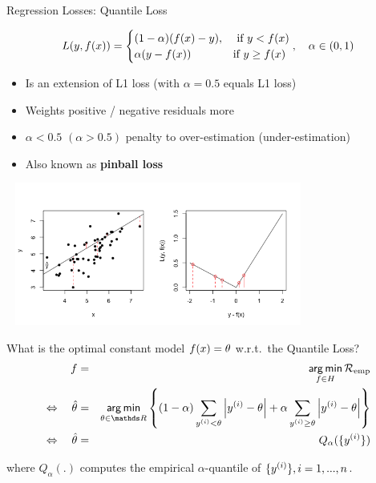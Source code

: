 \begin{vbframe}{Regression Losses: Quantile Loss}
\vspace{-0.3cm}

\footnotesize
$$
L(y, f(x)) = \begin{cases} (1 - \alpha) (f(x) - y), & \text{ if } y < f(x)\\
\alpha (y - f(x)) & \text{if } y \ge f(x)
\end{cases}, \quad \alpha \in (0, 1)
$$


\normalsize
\begin{itemize}
\item Is an extension of L1 loss (with $\alpha = 0.5$ equals L1 loss)
\item Weights positive / negative residuals more 
\item $\alpha<0.5$ $(\alpha>0.5)$ penalty to over-estimation (under-estimation)
\item Also known as \textbf{pinball loss}
\end{itemize}

\vspace*{-0.5cm}

\begin{center}
\includegraphics[width = 10cm, height = 4.7cm]{figure_man/2_3_loss_pinball_plot2.png}
\end{center}

\framebreak

What is the optimal constant model $f(x) = \theta$ w.r.t.\ the Quantile Loss?
\vspace{-0.2cm}
\begin{eqnarray*}
f &=& \argmin_{f \in \Hspace} \riske \\
\Leftrightarrow\quad 
\hat \theta &=& \argmin_{\theta \in \R}\left\{ (1 - \alpha) \sum_{\yi<\theta}  \left|\yi-\theta\right| + \alpha \sum_{\yi \geq\theta}  \left|\yi-\theta\right|\right\} \\
\Leftrightarrow\quad \hat \theta &=& Q_\alpha(\{\yi\})
\end{eqnarray*}

where $Q_\alpha(.)$ computes the empirical $\alpha$-quantile of $\{y^{(i)}\}, i = 1, ..., n$.


\end{vbframe}


\endlecture

